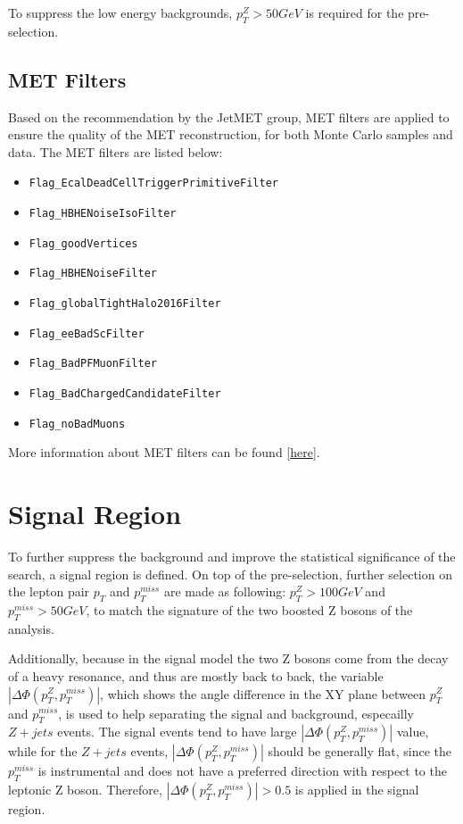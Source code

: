 \vspace{0.3cm}
To suppress the low energy backgrounds, $p_T ^Z > 50GeV$ is required for the pre-selection.


\subsection{MET Filters}\label{sec:metfilter}
Based on the recommendation by the JetMET group, MET filters are applied to ensure the quality of the MET reconstruction, for both Monte Carlo samples and data. The MET filters are listed below:
\begin{itemize}
\item \texttt{Flag\_EcalDeadCellTriggerPrimitiveFilter}
\item \texttt{Flag\_HBHENoiseIsoFilter}
\item \texttt{Flag\_goodVertices}
\item \texttt{Flag\_HBHENoiseFilter}
\item \texttt{Flag\_globalTightHalo2016Filter}
\item \texttt{Flag\_eeBadScFilter}
\item \texttt{Flag\_BadPFMuonFilter}
\item \texttt{Flag\_BadChargedCandidateFilter}
\item \texttt{Flag\_noBadMuons}
\end{itemize} 

More information about MET filters can be found [\href{https://twiki.cern.ch/twiki/bin/viewauth/CMS/MissingETOptionalFiltersRun2?rev=103}{here}].

\section{Signal Region}\label{sec:selection_sr}
To further suppress the background and improve the statistical significance of the search, a signal region is defined. On top of the pre-selection, further selection on the lepton pair $p_T$ and $p_T ^{miss}$ are made as following: $p_T ^Z > 100GeV$ and $p_T ^{miss} > 50GeV$, to match the signature of the two boosted Z bosons of the analysis. 

\vspace{0.3cm}
Additionally, because in the signal model the two Z bosons come from the decay of a heavy resonance, and thus are mostly back to back, the variable $|\Delta \Phi (p_T ^Z ,p_T ^{miss})|$, which shows the angle difference in the XY plane between $p_T ^Z$ and $p_T ^{miss}$, is used to help separating the signal and background, especailly $Z+jets$ events. The signal events tend to have large $|\Delta \Phi (p_T ^Z ,p_T ^{miss})|$ value, while for the $Z+jets$ events, $|\Delta \Phi (p_T ^Z ,p_T ^{miss})|$ should be generally flat, since the $p_T ^{miss}$ is instrumental and does not have a preferred direction with respect to the leptonic Z boson. Therefore, $|\Delta \Phi (p_T ^Z ,p_T ^{miss})|>0.5$ is applied in the signal region. 

